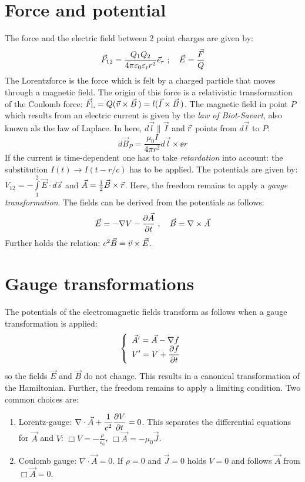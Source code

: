 \section{Force and potential}
The force and the electric field between 2 point charges are given by:
\[
\vec{F}_{12}=\frac{Q_1Q_2}{4\pi\varepsilon_0\varepsilon_{\rm r}r^2}\vec{e}_{r}
~;~~~\vec{E}=\frac{\vec{F}}{Q}
\]
The Lorentzforce is the force which is felt by a charged particle that moves
through a magnetic field. The origin of this force is a relativistic
transformation of the Coulomb force:
$\vec{F}_{\rm L}=Q(\vec{v}\times\vec{B}\,)=l(\vec{I}\times\vec{B}\,)$.
\npar
The magnetic field in point $P$ which results from an electric current is
given by the {\it law of Biot-Savart}, also known als the law of Laplace.
In here, $d\vec{l}\parallel\vec{I}$ and $\vec{r}$ points from $d\vec{l}$
to $P$:
\[
d\vec{B}_P=\frac{\mu_0I}{4\pi r^2}d\vec{l}\times\ee{r}
\]
If the current is time-dependent one has to take {\it retardation} into
account: the substitution $I(t)\rightarrow I(t-r/c)$ has to be applied.
\npar
The potentials are given by:
$\displaystyle V_{12}=-\int\limits_1^2\vec{E}\cdot d\vec{s}$ and
$\vec{A}=\mbox{$\frac{1}{2}$}\vec{B}\times\vec{r}$.
\npar
Here, the freedom remains to apply a {\it gauge transformation}. The fields
can be derived from the potentials as follows:
\[
\vec{E}=-\nabla V-\frac{\partial \vec{A}}{\partial t}~,~~~\vec{B}=\nabla\times\vec{A}
\]
Further holds the relation: $c^2\vec{B}=\vec{v}\times\vec{E}$.

\section{Gauge transformations}
The potentials of the electromagnetic fields transform as follows when a
gauge transformation is applied:
\[
\left\{\begin{array}{l}
\vec{A}'=\vec{A}-\nabla f\\
\displaystyle V'=V+\frac{\partial f}{\partial t}
\end{array}\right.
\]
so the fields $\vec{E}$ and $\vec{B}$ do not change. This results in a
canonical transformation of the Hamiltonian. Further, the freedom remains to
apply a limiting condition. Two common choices are:
\begin{enumerate}
\item Lorentz-gauge: $\displaystyle\nabla\cdot\vec{A}+\frac{1}{c^2}\frac{\partial V}{\partial t}=0$.
      This separates the differential equations for $\vec{A}$ and $V$:
      $\displaystyle\Box V=-\frac{\rho}{\varepsilon_0}$, $\Box\vec{A}=-\mu_0\vec{J}$.
\item Coulomb gauge: $\nabla\cdot\vec{A}=0$. If $\rho=0$ and $\vec{J}=0$ holds
      $V=0$ and follows $\vec{A}$ from $\Box\vec{A}=0$.
\end{enumerate}

